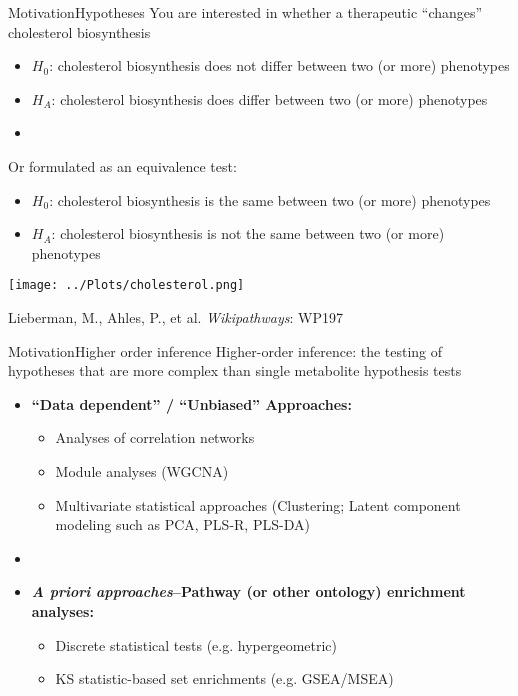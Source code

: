 \documentclass[xcolor=dvipsnames]{beamer}
\begin{document}
\begin{frame}{Motivation}{Hypotheses}
	\vspace{-10pt}
	You are interested in whether a therapeutic ``changes'' cholesterol biosynthesis \pause
	\begin{itemize}
		\item $H_0$: cholesterol biosynthesis does not differ between two (or more) phenotypes 
		\item $H_A$: cholesterol biosynthesis does differ between two (or more) phenotypes \pause
		\item[]
	\end{itemize} 
	
	Or formulated as an equivalence test:
	\begin{itemize}
		\item $H_0$: cholesterol biosynthesis is the same between two (or more) phenotypes 
		\item $H_A$: cholesterol biosynthesis is not the same between two (or more) phenotypes
	\end{itemize}
\end{frame}

\begin{frame}
	\begin{center}
		\texttt{[image: ../Plots/cholesterol.png]}
		
		Lieberman, M., Ahles, P., et al. \emph{Wikipathways}: WP197
	\end{center}
\end{frame}

\begin{frame}{Motivation}{Higher order inference}
	\vspace{-10pt}
	{\Large Higher-order inference: the testing of hypotheses that are more complex than single metabolite hypothesis tests} \vspace{7pt} \pause
	
	\begin{itemize}
		\item \textbf{``Data dependent'' / ``Unbiased'' Approaches:} 
		\begin{itemize}
		\item Analyses of correlation networks
		\item Module analyses (WGCNA)
		\item Multivariate statistical approaches (Clustering; Latent component modeling such as PCA, PLS-R, PLS-DA) \pause
		\end{itemize}
		\item[]
		\item \textbf{\emph{A priori approaches}--Pathway (or other ontology) enrichment analyses:} 
		\begin{itemize}
			\item Discrete statistical tests (e.g. hypergeometric)
			\item KS statistic-based set enrichments (e.g. GSEA/MSEA)
		\end{itemize}
	\end{itemize}
	
\end{frame}
\end{document}
